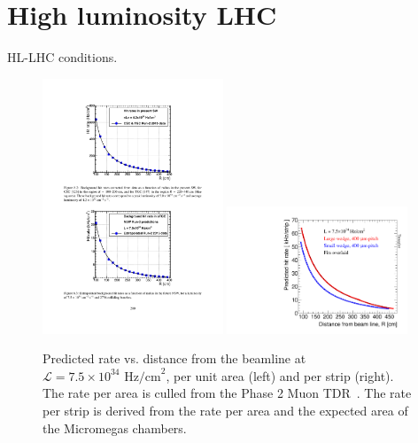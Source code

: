 \section{High luminosity LHC}
\label{sec:hllhc}

HL-LHC conditions.

\begin{figure}[!htpb]
  \begin{center}
    \includegraphics[width=0.48\textwidth]{figures/ilia.pdf}
    \includegraphics[width=0.48\textwidth]{figures/rate_per_strip.pdf}
  \end{center}
  \vspace{-10pt}
  \caption{Predicted rate vs. distance from the beamline at $\mathcal{L} = 7.5\times10^{34}\text{ Hz/cm}^2$, per unit area (left) and per strip (right). The rate per area is culled from the Phase 2 Muon TDR~\cite{phase2}. The rate per strip is derived from the rate per area and the expected area of the Micromegas chambers.}
  \label{fig:rate_vs_r}
\end{figure}

